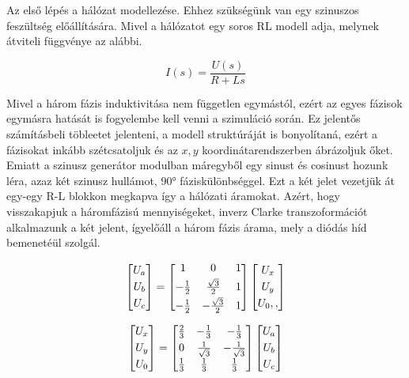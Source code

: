 Az első lépés a hálózat modellezése. Ehhez szükségünk van egy szinuszos feszültség előállítására. Mivel a hálózatot egy soros RL modell adja, melynek átviteli függvénye az alábbi. 

\begin{equation}
I(s) = \frac{U(s)}{R+Ls}
\end{equation}

Mivel a három fázis induktivitása nem független egymástól, ezért az egyes fázisok egymásra hatását is fogyelembe kell venni a szimuláció során. Ez jelentős számításbeli töbleetet jelenteni, a modell struktúráját is bonyolítaná, ezért a fázisokat inkább szétcsatoljuk és az $x,y$ koordinátarendszerben ábrázoljuk őket. Emiatt a szinusz generátor modulban máregyből egy sinust és cosinust hozunk léra, azaz két szinusz hullámot, $90°$ fáziskülönbséggel. Ezt a két jelet vezetjük át egy-egy R-L blokkon megkapva így a hálózati áramokat. Azért, hogy visszakapjuk a háromfázisú mennyiségeket, inverz Clarke transzoformációt alkalmazunk a két jelent, ígyelőáll a három fázis árama, mely a diódás híd bemenetéül szolgál.

\begin{equation}
\centering
\begin{bmatrix}
       U_a\\[0.3em]
       U_b\\[0.3em]
       U_c          
\end{bmatrix}
=
\begin{bmatrix}
       1 & 0 & 1  \\[0.3em]
       -\frac{1}{2} & \frac{\sqrt{3}}{2} & 1  \\[0.3em]
       -\frac{1}{2} & -\frac{\sqrt{3}}{2} & 1 
\end{bmatrix}
\begin{bmatrix}
       U_x\\[0.3em]
       U_y\\[0.3em]
       U_0,,        
\end{bmatrix}    
\end{equation}

\begin{equation}
\centering
\begin{bmatrix}
       U_x\\[0.3em]
       U_y\\[0.3em]
       U_0 
\end{bmatrix}
=
\begin{bmatrix}
       \frac{2}{3} & -\frac{1}{3} & -\frac{1}{3}  \\[0.3em]
       0 & \frac{1}{\sqrt{3}} & -\frac{1}{\sqrt{3}}  \\[0.3em]
       \frac{1}{3} & \frac{1}{3} & \frac{1}{3}    
\end{bmatrix}
\begin{bmatrix}
       U_a\\[0.3em]
       U_b\\[0.3em]
       U_c    
\end{bmatrix}
\end{equation}

